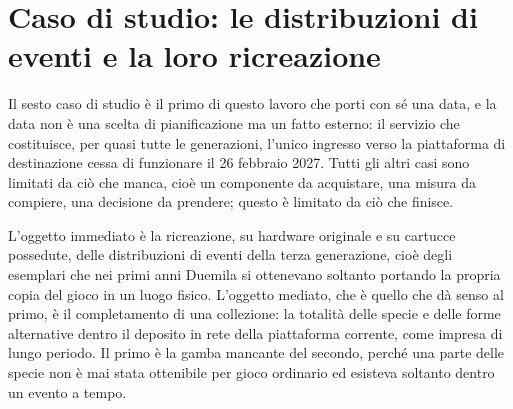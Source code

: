 
\chapter{Caso di studio: le distribuzioni di eventi e la loro ricreazione}
\label{cap:distribuzioni}

Il sesto caso di studio è il primo di questo lavoro che porti con sé una data, e la data non è una scelta di pianificazione ma un fatto esterno: il servizio che costituisce, per quasi tutte le generazioni, l'unico ingresso verso la piattaforma di destinazione cessa di funzionare il 26 febbraio 2027. Tutti gli altri casi sono limitati da ciò che manca, cioè un componente da acquistare, una misura da compiere, una decisione da prendere; questo è limitato da ciò che finisce.

L'oggetto immediato è la ricreazione, su hardware originale e su cartucce possedute, delle distribuzioni di eventi della terza generazione, cioè degli esemplari che nei primi anni Duemila si ottenevano soltanto portando la propria copia del gioco in un luogo fisico. L'oggetto mediato, che è quello che dà senso al primo, è il completamento di una collezione: la totalità delle specie e delle forme alternative dentro il deposito in rete della piattaforma corrente, come impresa di lungo periodo. Il primo è la gamba mancante del secondo, perché una parte delle specie non è mai stata ottenibile per gioco ordinario ed esisteva soltanto dentro un evento a tempo.

